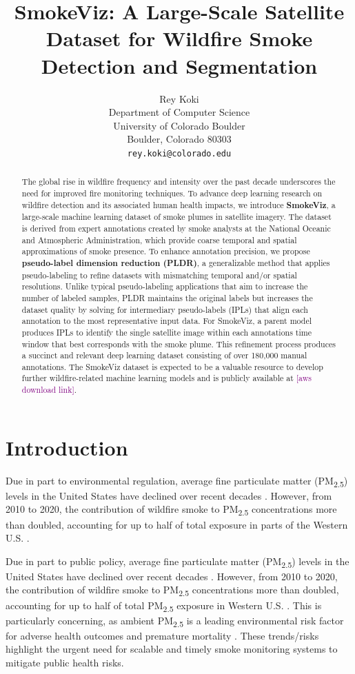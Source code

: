 \documentclass{article}
\title{SmokeViz: A Large-Scale Satellite Dataset for Wildfire Smoke Detection and Segmentation}
\author{%
  Rey Koki\\%
  Department of Computer Science\\
  University of Colorado Boulder\\
  Boulder, Colorado 80303\\
  \texttt{rey.koki@colorado.edu} \\
}
\newcommand\reynotes[1]{\textcolor{purple}{#1}}
\begin{document}
\maketitle


\begin{abstract}
    The global rise in wildfire frequency and intensity over the past decade underscores the need for improved fire monitoring techniques. To advance deep learning research on wildfire detection and its associated human health impacts, we introduce \textbf{SmokeViz}, a large-scale machine learning dataset of smoke plumes in satellite imagery. The dataset is derived from expert annotations created by smoke analysts at the National Oceanic and Atmospheric Administration, which provide coarse temporal and spatial approximations of smoke presence. To enhance annotation precision, we propose \textbf{pseudo-label dimension reduction (PLDR)}, a generalizable method that applies pseudo-labeling to refine datasets with mismatching temporal and/or spatial resolutions. Unlike typical pseudo-labeling applications that aim to increase the number of labeled samples, PLDR maintains the original labels but increases the dataset quality by solving for intermediary pseudo-labels (IPLs) that align each annotation to the most representative input data. For SmokeViz, a parent model produces IPLs to identify the single satellite image within each annotations time window that best corresponds with the smoke plume. This refinement process produces a succinct and relevant deep learning dataset consisting of over 180,000 manual annotations. The SmokeViz dataset is expected to be a valuable resource to develop further wildfire-related machine learning models and is publicly available at \reynotes{[aws download link]}.  
\end{abstract}


\section{Introduction}

Due in part to environmental regulation, average fine particulate matter (PM\textsubscript{2.5}) levels in the United States have declined over recent decades \cite{clean_air_act}. However, from 2010 to 2020, the contribution of wildfire smoke to PM\textsubscript{2.5} concentrations more than doubled, accounting for up to half of total exposure in parts of the Western U.S. \cite{smoke_PM}. 

Due in part to public policy, average fine particulate matter (PM\textsubscript{2.5}) levels in the United States have declined over recent decades \cite{clean_air_act}. However, from 2010 to 2020, the contribution of wildfire smoke to PM\textsubscript{2.5} concentrations more than doubled, accounting for up to half of total PM\textsubscript{2.5} exposure in Western U.S. \cite{smoke_PM}. This is particularly concerning, as ambient PM\textsubscript{2.5} is a leading environmental risk factor for adverse health outcomes and premature mortality \cite{smoke_mortality}. These trends/risks highlight the urgent need for scalable and timely smoke monitoring systems to mitigate public health risks.
\end{document}
